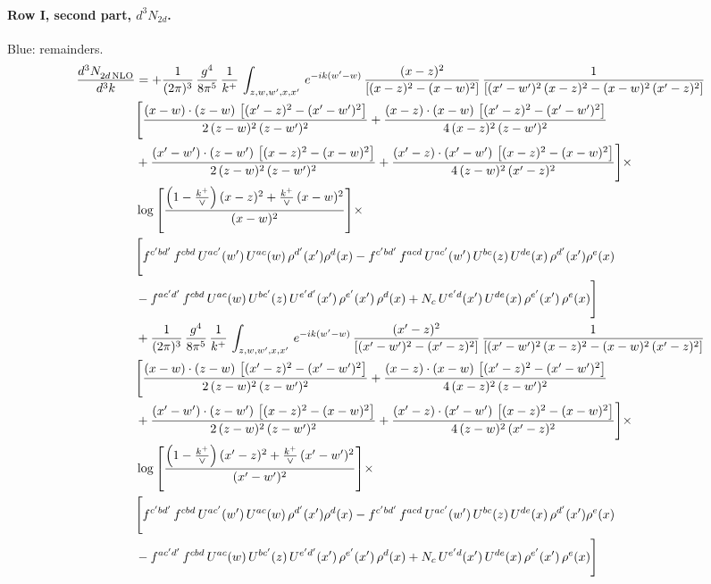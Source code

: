 \documentclass[10pt]{article}
\numberwithin{equation}{section}
\newcommand{\new}[1]{{\color{blue}#1}}
\begin{document}
\paragraph{Row I, second part, $d^3N_{2d}$.}
\new{Blue}: remainders.
\begin{align}
 \frac{d^{3}N_{2d\,\rm NLO}^{\rm}}{d^{3}k}  & =   +\frac{1}{(2\pi)^{3}}\, \frac{g^{4}}{8\pi^{5}}\,\frac{1}{k^{+}}\,\int_{z,w,w^{\prime},x,x'}\, e^{-ik(w^{\prime}-w)}\,\frac{(x-z)^{2}}{\left[(x-z)^{2}-(x-w)^{2}\right]}\,\frac{1}{\left[(x'-w')^{2}\,(x-z)^{2} - (x-w)^{2}\,(x'-z)^{2}\right]}\notag \\ & \Bigg[\frac{(x-w)\cdot (z-w)\, \left[(x'-z)^{2}-(x'-w')^{2}\right]}{2\, (z-w)^{2}\, (z-w')^{2}}  + \frac{(x-z)\cdot (x-w)\,\left[(x'-z)^{2}-(x'-w')^{2}\right] }{4\,(x-z)^{2}\,(z-w')^{2}}\notag \\ & +\frac{(x'-w')\cdot (z-w')\, \left[(x-z)^{2}-(x-w)^{2}\right]}{2\, (z-w)^{2}\, (z-w')^{2}}+ \frac{(x'-z)\cdot (x'-w')\, \left[(x-z)^{2}-(x-w)^{2}\right]}{4\, (z-w)^{2}\,(x'-z)^{2}}\Bigg]\times\,\notag \\ & \log{\left[\frac{\left(1-\frac{k^{+}}{\vee}\right)(x-z)^{2}+\frac{k^{+}}{\vee}\,(x-w)^{2}}{(x-w)^{2}}\right]} \times\notag \\ & \Bigg[f^{c'bd'}\,f^{cbd}\, U^{ac'}(w')\,U^{ac}(w)\,\rho^{d'}(x')\rho^{d}(x)- f^{c'bd'}\,f^{acd}\,U^{ac'}(w')\,U^{bc}(z)\,U^{de}(x)\,\rho^{d'}(x')\rho^{e}(x) \notag \\ & -f^{ac'd'}\,f^{cbd}\,U^{ac}(w)\,U^{bc'}(z)\,U^{e'd'}(x')\,\rho^{e'}(x')\,\rho^{d}(x) +N_{c}\,U^{e'd}(x')\,U^{de}(x)\,\rho^{e'}(x')\,\rho^{e}(x)\Bigg] \notag \\
& +\frac{1}{(2\pi)^{3}}\, \frac{g^{4}}{8\pi^{5}}\,\frac{1}{k^{+}}\,\int_{z,w,w^{\prime},x,x'}\, e^{-ik(w^{\prime}-w)}\,\frac{(x'-z)^{2}}{\left[(x'-w')^{2}-(x'-z)^{2}\right]}\,\frac{1}{\left[(x'-w')^{2}\,(x-z)^{2} - (x-w)^{2}\,(x'-z)^{2}\right]}\notag \\ & \Bigg[\frac{(x-w)\cdot (z-w)\, \left[(x'-z)^{2}-(x'-w')^{2}\right]}{2\, (z-w)^{2}\, (z-w')^{2}}  + \frac{(x-z)\cdot (x-w)\,\left[(x'-z)^{2}-(x'-w')^{2}\right] }{4\,(x-z)^{2}\,(z-w')^{2}}\notag \\ & +\frac{(x'-w')\cdot (z-w')\, \left[(x-z)^{2}-(x-w)^{2}\right]}{2\, (z-w)^{2}\, (z-w')^{2}}+ \frac{(x'-z)\cdot (x'-w')\, \left[(x-z)^{2}-(x-w)^{2}\right]}{4\, (z-w)^{2}\,(x'-z)^{2}}\Bigg]\times\,\notag \\ & \log{\left[\frac{\left(1-\frac{k^{+}}{\vee}\right)(x'-z)^{2}+\frac{k^{+}}{\vee}\,(x'-w')^{2}}{(x'-w')^{2}}\right]} \times\notag \\ & \Bigg[f^{c'bd'}\,f^{cbd}\, U^{ac'}(w')\,U^{ac}(w)\,\rho^{d'}(x')\rho^{d}(x)- f^{c'bd'}\,f^{acd}\,U^{ac'}(w')\,U^{bc}(z)\,U^{de}(x)\,\rho^{d'}(x')\rho^{e}(x) \notag \\ & -f^{ac'd'}\,f^{cbd}\,U^{ac}(w)\,U^{bc'}(z)\,U^{e'd'}(x')\,\rho^{e'}(x')\,\rho^{d}(x) +N_{c}\,U^{e'd}(x')\,U^{de}(x)\,\rho^{e'}(x')\,\rho^{e}(x)\Bigg] \label{eq:F:G2I2d}
\end{align}
\end{document}
